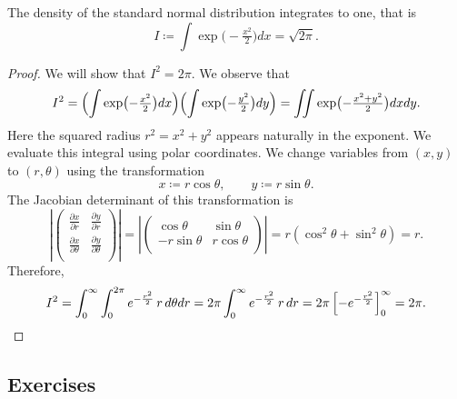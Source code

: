 \begin{lemma}
    \label{lem: standard normal density integrates to one}
    The density of the standard normal distribution integrates to one, that is
    \[
        I \coloneq \int \exp\bigl(-\tfrac{x^2}{2}\bigr) dx = \sqrt{2\pi}.
    \]
\end{lemma}
\begin{proof}
We will show that $I^2=2\pi$. We observe that
\[
I^2 =
    \Bigl(\int \exp\bigl(-\tfrac{x^2}{2}\bigr) dx \Bigr)
    \Bigl(\int \exp\bigl(-\tfrac{y^2}{2}\bigr) dy \Bigr)
    =\iint \exp\bigl(-\tfrac{x^2+y^2}{2}\bigr) dx dy.
\]
Here the squared radius \(r^2 = x^2 + y^2\) appears naturally in the exponent.
We evaluate this integral using polar coordinates. We change variables from $(x,y)$ to $(r,\theta)$ using the transformation
\[
    x \coloneqq r \cos\theta, \qquad y \coloneqq r \sin\theta.
\]
The Jacobian determinant of this transformation is
\[
\left|\begin{pmatrix}
\frac{\partial x}{\partial r} & \frac{\partial y}{\partial r} \\
\frac{\partial x}{\partial \theta} & \frac{\partial y}{\partial \theta} \\
\end{pmatrix}\right| 
= \left|\begin{pmatrix}
\cos\theta & \sin\theta \\
-r\sin\theta & r\cos\theta \\
\end{pmatrix}\right| = r(\cos^2\theta + \sin^2\theta) = r.
\]
Therefore,
\[
I^2 = 
\int_{0}^\infty \int_{0}^{2\pi} e^{-\frac{r^2}{2}} \, r \, d\theta dr
=  2\pi \int_0^\infty e^{-\frac{r^2}{2}} \, r \, dr 
= 2\pi \left[-e^{-\frac{r^2}{2}}\right]_{0}^{\infty}
= 2\pi.
\qedhere
\]
\end{proof}

\subsection*{Exercises}

